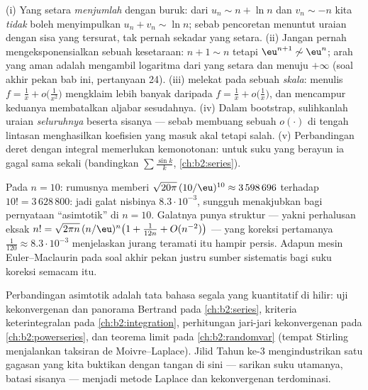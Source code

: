 \begin{remark}\label{rem:b2:comparison:pitfalls}
(i) Yang setara \emph{menjumlah} dengan buruk: dari $u_n \sim n + \ln n$
dan $v_n \sim -n$ kita \emph{tidak} boleh menyimpulkan $u_n + v_n \sim
\ln n$; sebab pencoretan menuntut uraian dengan sisa yang tersurat,
tak pernah sekadar yang setara. (ii) Jangan pernah mengeksponensialkan
sebuah kesetaraan: $n + 1 \sim n$ tetapi $\eu^{n+1} \not\sim \eu^n$;
arah yang aman adalah mengambil logaritma dari yang setara dan menuju
$+\infty$ (soal akhir pekan bab ini, pertanyaan 24). (iii)
 melekat pada sebuah \emph{skala}: menulis
$f = \frac1x + o\bigl(\frac1{x^2}\bigr)$ mengklaim lebih banyak daripada
$f = \frac1x + o\bigl(\frac1x\bigr)$, dan mencampur keduanya membatalkan
aljabar sesudahnya. (iv) Dalam bootstrap, sulihkanlah
uraian \emph{seluruhnya} beserta sisanya --- sebab membuang
sebuah $o(\cdot)$ di tengah lintasan menghasilkan koefisien yang masuk
akal tetapi salah. (v) Perbandingan deret dengan integral memerlukan
kemonotonan: untuk suku yang berayun ia gagal sama sekali (bandingkan
$\sum\frac{\sin k}k$, \cref{ch:b2:series}).
\end{remark}

\begin{example}\label{ex:b2:comparison:stirlingnum}
Pada $n = 10$: rumusnya memberi $\sqrt{20\pi}\,(10/\eu)^{10}
\approx 3\,598\,696$ terhadap $10! = 3\,628\,800$: jadi galat nisbinya
$8.3\cdot10^{-3}$, sungguh menakjubkan bagi pernyataan ``asimtotik'' di
$n = 10$. Galatnya punya struktur --- yakni perhalusan eksak $n!
= \sqrt{2\pi n}\,(n/\eu)^n\bigl(1 + \frac1{12n} +
O(n^{-2})\bigr)$ --- yang koreksi pertamanya $\frac1{120} \approx
8.3\cdot10^{-3}$ menjelaskan jurang teramati itu hampir persis. Adapun
mesin Euler--Maclaurin pada soal akhir pekan justru sumber sistematis
bagi suku koreksi semacam itu.
\end{example}

\begin{remark}
Perbandingan asimtotik adalah tata bahasa segala yang kuantitatif
di hilir: uji kekonvergenan dan panorama Bertrand pada
\cref{ch:b2:series}, kriteria keterintegralan pada
\cref{ch:b2:integration}, perhitungan jari-jari kekonvergenan
pada \cref{ch:b2:powerseries}, dan teorema limit pada
\cref{ch:b2:randomvar} (tempat Stirling menjalankan taksiran de
Moivre--Laplace). Jilid Tahun ke-3 mengindustrikan satu gagasan yang
kita buktikan dengan tangan di sini --- sarikan suku utamanya, batasi
sisanya --- menjadi metode Laplace dan kekonvergenan terdominasi.
\end{remark}

